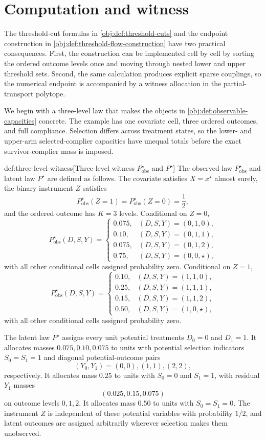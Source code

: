 \documentclass[11pt]{article}
\begin{document}
\section{Computation and witness}\label{sec:algorithm-example}

The threshold-cut formulas in \cref{obj:def:threshold-cuts} and the endpoint construction in \cref{obj:def:threshold-flow-construction} have two practical consequences.  First, the construction can be implemented cell by cell by sorting the ordered outcome levels once and moving through nested lower and upper threshold sets.  Second, the same calculation produces explicit sparse couplings, so the numerical endpoint is accompanied by a witness allocation in the partial-transport polytope.

We begin with a three-level law that makes the objects in \cref{obj:def:observable-capacities} concrete.  The example has one covariate cell, three ordered outcomes, and full compliance.  Selection differs across treatment states, so the lower- and upper-arm selected-complier capacities have unequal totals before the exact survivor-complier mass is imposed.

\begin{definitionv}{def:three-level-witness}[Three-level witness \(P_{\mathrm{obs}}^{\star}\) and \(P^{\star}\)]
The observed law \(P_{\mathrm{obs}}^{\star}\) and latent law \(P^{\star}\) are defined as follows. The covariate satisfies \(X=x^{\star}\) almost surely, the binary instrument \(Z\) satisfies
\[
P_{\mathrm{obs}}^{\star}(Z=1)=P_{\mathrm{obs}}^{\star}(Z=0)=\frac12,
\]
and the ordered outcome has \(K=3\) levels. Conditional on \(Z=0\),
\[
P_{\mathrm{obs}}^{\star}(D,S,Y) =
\begin{cases}
0.075, & (D,S,Y)=(0,1,0),\\
0.10, & (D,S,Y)=(0,1,1),\\
0.075, & (D,S,Y)=(0,1,2),\\
0.75, & (D,S,Y)=(0,0,\star),
\end{cases}
\]
with all other conditional cells assigned probability zero. Conditional on \(Z=1\),
\[
P_{\mathrm{obs}}^{\star}(D,S,Y) =
\begin{cases}
0.10, & (D,S,Y)=(1,1,0),\\
0.25, & (D,S,Y)=(1,1,1),\\
0.15, & (D,S,Y)=(1,1,2),\\
0.50, & (D,S,Y)=(1,0,\star),
\end{cases}
\]
with all other conditional cells assigned probability zero.

The latent law \(P^{\star}\) assigns every unit potential treatments \(D_0=0\) and \(D_1=1\). It allocates masses \(0.075,0.10,0.075\) to units with potential selection indicators \(S_0=S_1=1\) and diagonal potential-outcome pairs
\[
(Y_0,Y_1)=(0,0),(1,1),(2,2),
\]
respectively. It allocates mass \(0.25\) to units with \(S_0=0\) and \(S_1=1\), with residual \(Y_1\) masses
\[
(0.025,0.15,0.075)
\]
on outcome levels \(0,1,2\). It allocates mass \(0.50\) to units with \(S_0=S_1=0\). The instrument \(Z\) is independent of these potential variables with probability \(1/2\), and latent outcomes are assigned arbitrarily wherever selection makes them unobserved.
\end{definitionv}
\end{document}
